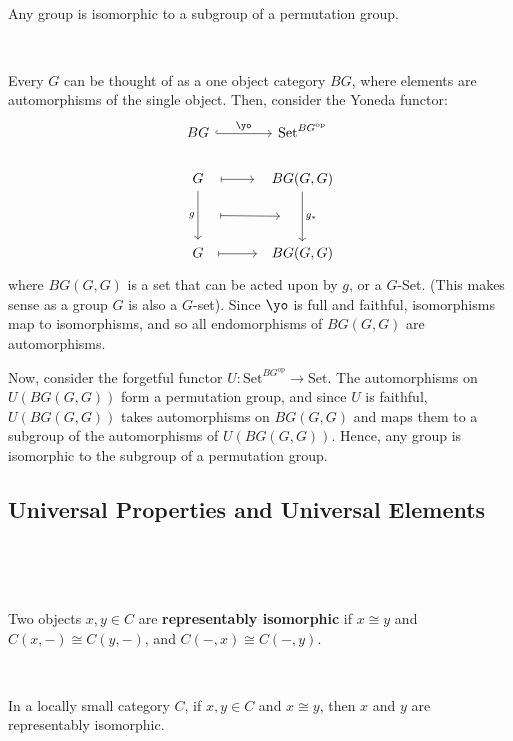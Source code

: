 \documentclass{article}
\begin{document}
\begin{corollary}
\

Any group is isomorphic to a subgroup of a permutation group.
\end{corollary}

\begin{customproof}
\

Every $G$ can be thought of as a one object category $BG$, where elements are automorphisms of the single object. Then, consider the Yoneda functor: \[\begin{tikzcd}[column sep=large]
	BG & \text{Set}^{BG^\text{op}}\\
	G & BG(G,G)\\
	\\
	G & BG(G,G)
	\arrow[from=1-1, to=1-2, hook, "\yo"]
	\arrow[from=2-1, to=2-2, mapsto, shorten=8]
	\arrow[from=2-1, to=4-1, "g"'{name=F}, shorten=2]
	\arrow[from=2-2, to=4-2, "g_*"{name=G}]
	\arrow[from=F, to=G, mapsto, shorten=16]
	\arrow[from=4-1, to=4-2, mapsto, shorten=6]
\end{tikzcd}\]where $BG(G,G)$ is a set that can be acted upon by $g$, or a $G$-Set. (This makes sense as a group $G$ is also a $G$-set). Since $\yo$ is full and faithful, isomorphisms map to isomorphisms, and so all endomorphisms of $BG(G,G)$ are automorphisms. 

Now, consider the forgetful functor $U: \text{Set}^{BG^\text{op}} \to \text{Set}$. The automorphisms on $U(BG(G,G))$ form a permutation group, and since $U$ is faithful, $U(BG(G,G))$ takes automorphisms on $BG(G,G)$ and maps them to a subgroup of the automorphisms of $U(BG(G,G))$. Hence, any group is isomorphic to the subgroup of a permutation group.
\end{customproof}

\subsection{Universal Properties and Universal Elements}
\

\begin{definition}
\

Two objects $x, y \in C$ are \textbf{representably isomorphic} if $x \cong y$ and $C(x, -) \cong C(y, -)$, and $C(-, x) \cong C(-,y)$. 
\end{definition}

\begin{corollary}
\

In a locally small category $C$, if $x, y \in C$ and $x \cong y$, then $x$ and $y$ are representably isomorphic.
\end{corollary}
\end{document}
